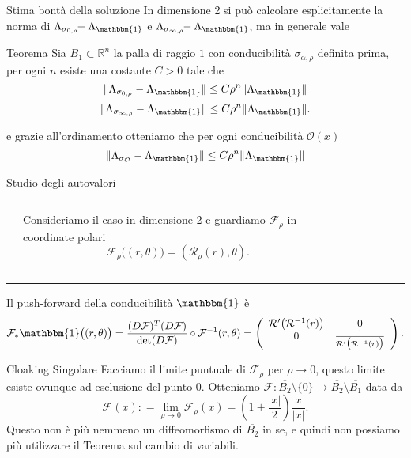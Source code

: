 \documentclass{beamer}
\newcommand{\bbR}{\mathbb{R}}
\newcommand{\OO}{\mathcal{O}}
\newcommand{\F}{\mathcal{F}}
\newcommand{\R}{\mathcal{R}}
\newcommand{\1}{\mathbbm{1}}
\begin{document}
\begin{frame}{Stima bontà della soluzione}
In dimensione 2 si può calcolare esplicitamente la norma di $\Lambda_{\sigma_{0,\rho}}\!\!- \Lambda_\1$ e $\Lambda_{\sigma_{\infty,\rho}}\!\!- \Lambda_\1$, ma in generale vale
\pause
\begin{block}{Teorema}
Sia $B_1\subset\bbR^n$ la palla di raggio $1$ con conducibilità $\sigma_{\alpha,\rho}$ definita prima, per ogni $n$ esiste una costante $C>0$ tale che
\[
\Vert\Lambda_{\sigma_{0,\rho}} - \Lambda_\1\Vert \le C\rho^n\Vert\Lambda_\1\Vert
\]
\[
\Vert\Lambda_{\sigma_{\infty,\rho}} - \Lambda_\1\Vert \le C\rho^n\Vert\Lambda_\1\Vert.
\]
\end{block}
\pause
e grazie all'ordinamento otteniamo che per ogni conducibilità $\OO(x)$
\[
\Vert\Lambda_{\sigma_\OO} - \Lambda_\1\Vert
\le
C\rho^n\Vert\Lambda_\1\Vert
\]
\end{frame}


\begin{frame}{Studio degli autovalori}
\begin{columns}
\begin{column}{.05 \textwidth}
\end{column}
\begin{column}{.4 \textwidth}
Consideriamo il caso in dimensione 2 e guardiamo $\F_\rho$ in coordinate polari
\[
\F_\rho\big((r,\theta)\big) = (\R_\rho(r),\theta).
\]
\end{column}
\pause
\begin{column}{.6 \textwidth}
\begin{figure}[H]
\def\svgwidth{\linewidth}

\end{figure}
\end{column}
\end{columns}

\pause
\hrule
\vspace{10pt}
Il push-forward della conducibilità $\1$ è
\[
\F_*\1\big((r,\theta)\big) = 
\frac{(D\F)^T(D\F)}{\det(D\F)} \circ \F^{-1} (r,\theta)
=
	\left(
		\begin{array}{cc}
         \R'\big(\R^{-1}(r)\big)  &  0 \\
         0  &  \frac{1}{\R'\big(\R^{-1}(r)\big)}
    	\end{array}
    \right).
\]
\end{frame}


\begin{frame}{Cloaking Singolare}
\pause
Facciamo il limite puntuale di $\F_\rho$ per $\rho\rightarrow0$, questo limite esiste ovunque ad esclusione del punto $0$. 
\pause
Otteniamo $\F:\overline{B_2}\setminus\{0\} \rightarrow \overline{B_2}\setminus \overline{B_1}$ data da
\[
\F(x):
=\lim_{\rho\rightarrow0}\F_\rho(x)
= \left(1 + \frac{|x|}{2}\right) \frac{x}{|x|}.
\]
\pause
Questo non è più nemmeno un diffeomorfismo di $\overline{B_2}$ in se, e quindi non possiamo più utilizzare il Teorema sul cambio di variabili.
\end{frame}
\end{document}
